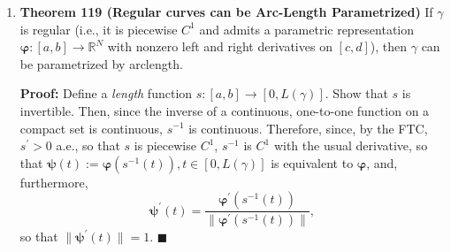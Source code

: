 \documentclass[11pt]{article}
\newcommand{\bvarphi}{\boldsymbol{\varphi}}
\newcommand{\bpsi}{\boldsymbol{\psi}}
\begin{document}
\begin{enumerate}
\item \textbf{Theorem 119 (Regular curves can be Arc-Length Parametrized)}
If $\gamma$ is regular (i.e., it is piecewise $C^1$ and admits a parametric
representation $\bvarphi: [a,b] \rightarrow \mathbb{R}^N$ with nonzero left
and right derivatives on $[c,d]$), then $\gamma$ can be parametrized by
arclength.

{\bf Proof:} Define a \emph{length} function
$s: [a,b] \rightarrow [0,L(\gamma)]$. Show that $s$ is invertible. Then, since
the inverse of a continuous, one-to-one function on a compact set is
continuous, $s^{-1}$ is continuous. Therefore, since, by the FTC,
$s^{\prime} > 0$ a.e., so that $s$ is piecewise $C^1$, $s^{-1}$ is $C^1$ with
the usual derivative, so that
$\bpsi(t) := \bvarphi(s^{-1}(t)), t \in [0,L(\gamma)]$ is equivalent to
$\bvarphi$, and, furthermore,
\[\bpsi^{\prime}(t)
 = \frac{\bvarphi^{\prime}(s^{-1}(t))}
        {\|\bvarphi^{\prime}(s^{-1}(t))\|}
,\] so that $\|\bpsi^{\prime}(t)\| = 1$. \quad $\blacksquare$

\end{enumerate}
\end{document}
